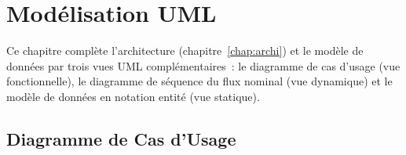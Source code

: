 \documentclass[12pt,a4paper,openany]{report}
\begin{document}
    \chapter{Mod\'elisation UML}
    \label{chap:uml}

    Ce chapitre compl\`ete l'architecture (chapitre~\ref{chap:archi}) et le mod\`ele de donn\'ees par trois vues UML compl\'ementaires~: le diagramme de cas d'usage (vue fonctionnelle), le diagramme de s\'equence du flux nominal (vue dynamique) et le mod\`ele de donn\'ees en notation entit\'e (vue statique).

    \section{Diagramme de Cas d'Usage}
\end{document}
